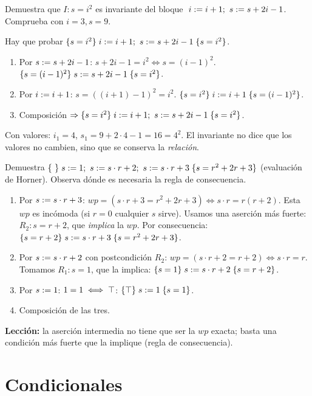 \begin{prob}
Demuestra que $I: s=i^2$ es invariante del bloque $\;i\mathrel{:=} i+1;\ s\mathrel{:=} s+2i-1$. Comprueba con $i=3,s=9$.
\end{prob}
\begin{sol}
Hay que probar $\hoare{s=i^2}{i\asg i+1;\ s\asg s+2i-1}{s=i^2}$.
\begin{enumerate}
\item Por $s\mathrel{:=} s+2i-1$: $s+2i-1=i^2\iff s=(i-1)^2$. \quad $\{s=(i-1)^2\}\;s\mathrel{:=} s+2i-1\;\{s=i^2\}$.
\item Por $i\mathrel{:=} i+1$: $s=((i+1)-1)^2=i^2$. \quad $\{s=i^2\}\;i\mathrel{:=} i+1\;\{s=(i-1)^2\}$.
\item Composición $\Rightarrow\{s=i^2\}\;i\mathrel{:=} i+1;\ s\mathrel{:=} s+2i-1\;\{s=i^2\}$. \checkmark
\end{enumerate}
Con valores: $i_1=4$, $s_1=9+2\cdot4-1=16=4^2$. El invariante no dice que los valores no cambien, sino que se conserva la \emph{relación}.
\end{sol}

\begin{prob}
Demuestra $\{\ \}\;s\mathrel{:=}1;\ s\mathrel{:=} s\cdot r+2;\ s\mathrel{:=} s\cdot r+3\;\{s=r^2+2r+3\}$ (evaluación de Horner). Observa dónde es necesaria la regla de consecuencia.
\end{prob}
\begin{sol}
\begin{enumerate}
\item Por $s\mathrel{:=} s\cdot r+3$: $wp=(s\cdot r+3=r^2+2r+3)\iff s\cdot r=r(r+2)$. Esta $wp$ es incómoda (si $r=0$ cualquier $s$ sirve). Usamos una aserción más fuerte: $R_2: s=r+2$, que \emph{implica} la $wp$. Por consecuencia: $\{s=r+2\}\;s\mathrel{:=} s\cdot r+3\;\{s=r^2+2r+3\}$.
\item Por $s\mathrel{:=} s\cdot r+2$ con postcondición $R_2$: $wp=(s\cdot r+2=r+2)\iff s\cdot r=r$. Tomamos $R_1: s=1$, que la implica: $\{s=1\}\;s\mathrel{:=} s\cdot r+2\;\{s=r+2\}$.
\item Por $s\mathrel{:=}1$: $1=1\iff\top$: $\{\top\}\;s\mathrel{:=}1\;\{s=1\}$.
\item Composición de las tres. \checkmark
\end{enumerate}
\textbf{Lección:} la aserción intermedia no tiene que ser la $wp$ exacta; basta una condición más fuerte que la implique (regla de consecuencia).
\end{sol}

\section{Condicionales}

